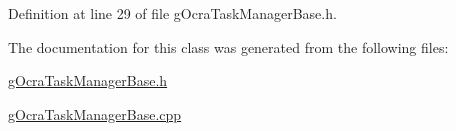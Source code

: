 Definition at line 29 of file g\+Ocra\+Task\+Manager\+Base.\+h.



The documentation for this class was generated from the following files\+:\begin{DoxyCompactItemize}
\item 
\hyperlink{gOcraTaskManagerBase_8h}{g\+Ocra\+Task\+Manager\+Base.\+h}\item 
\hyperlink{gOcraTaskManagerBase_8cpp}{g\+Ocra\+Task\+Manager\+Base.\+cpp}\end{DoxyCompactItemize}
